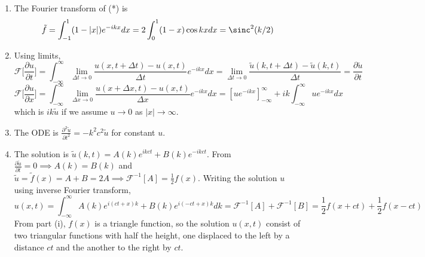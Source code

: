 \documentclass[a4paper]{article}
\begin{document}
\begin{ans}\leavevmode
\begin{enumerate}[label=(\roman*)]
\item The Fourier transform of (*) is
$$\tilde{f}=\int_{-1}^1(1-|x|)e^{-ikx}dx=2\int_0^1(1-x)\cos kx dx=\sinc^2(k/2)$$
\item Using limits,
$$\mathcal{F}\bigg[\frac{\partial u}{\partial t}\bigg]=\int_{-\infty}^\infty\lim_{\Delta t\rightarrow 0}\frac{u(x,t+\Delta t)-u(x,t)}{\Delta t}e^{-ikx}dx=\lim_{\Delta t\rightarrow 0}\frac{\tilde{u}(k,t+\Delta t)-\tilde{u}(k,t)}{\Delta t}=\frac{\partial\tilde{u}}{\partial t}$$
$$\mathcal{F}\bigg[\frac{\partial u}{\partial x}\bigg]=\int_{-\infty}^\infty\lim_{\Delta x\rightarrow 0}\frac{u(x+\Delta x,t)-u(x,t)}{\Delta x}e^{-ikx}dx=[ue^{-ikx}]_{-\infty}^\infty+ik\int_{-\infty}^\infty ue^{-ikx}dx$$
which is $ik\tilde{u}$ if we assume $u\rightarrow 0$ as $|x|\rightarrow\infty$.
\item The ODE is $\frac{\partial^2\tilde{u}}{\partial t^2}=-k^2c^2\tilde{u}$ for constant $u$.
\item The solution is $\tilde{u}(k,t)=A(k)e^{ikct}+B(k)e^{-ikct}$. From $\frac{\partial\tilde{u}}{\partial t}=0\implies A(k)=B(k)$ and $\tilde{u}=\tilde{f}(x)=A+B=2A\implies\mathcal{F}^{-1}[A]=\frac{1}{2}f(x)$. Writing the solution $u$ using inverse Fourier transform,
$$u(x,t)=\int_{-\infty}^\infty A(k)e^{i(ct+x)k}+B(k)e^{i(-ct+x)k}dk=\mathcal{F}^{-1}[A]+\mathcal{F}^{-1}[B]=\frac{1}{2}f(x+ct)+\frac{1}{2}f(x-ct)$$
From part (i), $f(x)$ is a triangle function, so the solution $u(x,t)$ consist of two triangular functions with half the height, one displaced to the left by a distance $ct$ and the another to the right by $ct$.
\end{enumerate}
\end{ans}
\newpage
\end{document}
